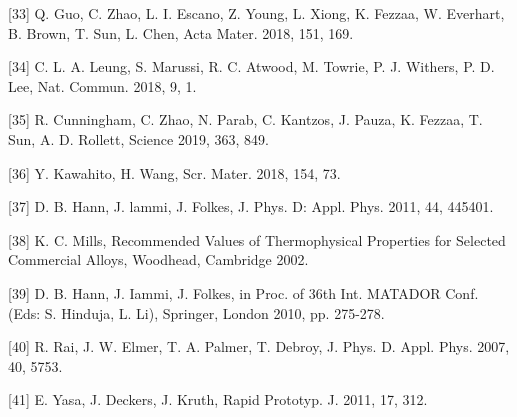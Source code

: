 \documentclass[10pt]{article}
\begin{document}
[33] Q. Guo, C. Zhao, L. I. Escano, Z. Young, L. Xiong, K. Fezzaa, W. Everhart, B. Brown, T. Sun, L. Chen, Acta Mater. 2018, 151, 169.

[34] C. L. A. Leung, S. Marussi, R. C. Atwood, M. Towrie, P. J. Withers, P. D. Lee, Nat. Commun. 2018, 9, 1.

[35] R. Cunningham, C. Zhao, N. Parab, C. Kantzos, J. Pauza, K. Fezzaa, T. Sun, A. D. Rollett, Science 2019, 363, 849.

[36] Y. Kawahito, H. Wang, Scr. Mater. 2018, 154, 73.

[37] D. B. Hann, J. lammi, J. Folkes, J. Phys. D: Appl. Phys. 2011, 44, 445401.

[38] K. C. Mills, Recommended Values of Thermophysical Properties for Selected Commercial Alloys, Woodhead, Cambridge 2002.

[39] D. B. Hann, J. Iammi, J. Folkes, in Proc. of 36th Int. MATADOR Conf. (Eds: S. Hinduja, L. Li), Springer, London 2010, pp. 275-278.

[40] R. Rai, J. W. Elmer, T. A. Palmer, T. Debroy, J. Phys. D. Appl. Phys. 2007, 40, 5753.

[41] E. Yasa, J. Deckers, J. Kruth, Rapid Prototyp. J. 2011, 17, 312.
\end{document}
